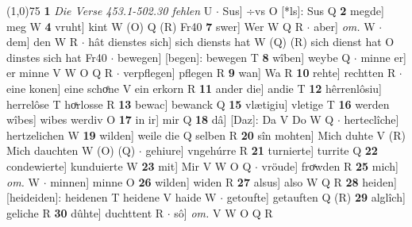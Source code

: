 \documentclass[8pt,a4paper,notitlepage]{article}
\begin{document}
\begin{table}[ht]
\begin{minipage}[t]{0.5\linewidth}
\line(1,0){75} \newline
\textbf{1} \textit{Die Verse 453.1-502.30 fehlen} U   $\cdot$ Sus] ÷vs O [*ls]: Sus Q \textbf{2} megde] meg W \textbf{4} vruht] kint W (O) Q (R) Fr40 \textbf{7} swer] Wer W Q R  $\cdot$ aber] \textit{om.} W  $\cdot$ dem] den W R  $\cdot$ hât dienstes sich] sich diensts hat W (Q) (R) sich dienst hat O dinstes sich hat Fr40  $\cdot$ bewegen] [begen]: bewegen T \textbf{8} wîben] weybe Q  $\cdot$ minne er] er minne V W O Q R  $\cdot$ verpflegen] pflegen R \textbf{9} wan] Wa R \textbf{10} rehte] rechtten R  $\cdot$ eine konen] eine schoͤne V ein erkorn R \textbf{11} ander die] andie T \textbf{12} hêrrenlôsiu] herrelôse T hoͯrlosse R \textbf{13} bewac] bewanck Q \textbf{15} vlætigiu] vletige T \textbf{16} werden wîbes] wibes werdiv O \textbf{17} in ir] mir Q \textbf{18} dâ] [Daz]: Da V Do W Q  $\cdot$ herteclîche] hertzelichen W \textbf{19} wilden] weile die Q selben R \textbf{20} sîn mohten] Mich duhte V (R) Mich dauchten W (O) (Q)  $\cdot$ gehiure] vngehúrre R \textbf{21} turnierte] turrite Q \textbf{22} condewierte] kunduierte W \textbf{23} mit] Mir V W O Q  $\cdot$ vröude] froͯwden R \textbf{25} mich] \textit{om.} W  $\cdot$ minnen] minne O \textbf{26} wilden] widen R \textbf{27} alsus] also W Q R \textbf{28} heiden] [heideiden]: heidenen T heidene V haide W  $\cdot$ getoufte] getauften Q (R) \textbf{29} alglîch] geliche R \textbf{30} dûhte] duchttent R  $\cdot$ sô] \textit{om.} V W O Q R \newline
\end{minipage}
\end{table}
\end{document}
